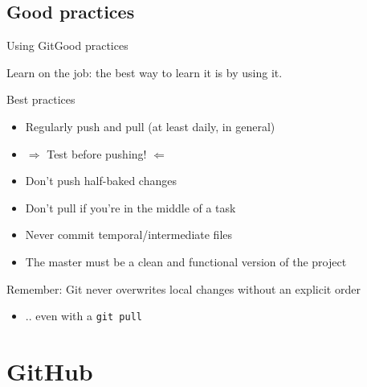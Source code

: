 \documentclass[10pt,compress]{beamer} %
\begin{document}



\subsection{Good practices}
\begin{frame}{Using Git}{Good practices}


Learn on the job: the best way to learn it is by using it. 

\bigskip

Best practices
\begin{itemize}
  \item Regularly push and pull (at least daily, in general)
  \item $\Rightarrow$ Test before pushing! $\Leftarrow$
  \item Don't push half-baked changes 
  \item Don't pull if you're in the middle of a task
  \item Never commit temporal/intermediate files
  \item The master must be a clean and functional version of the project
\end{itemize}

Remember: Git never overwrites local changes without an explicit order
\begin{itemize}
  \item .. even with a \texttt{git pull}
\end{itemize}

\end{frame}


\section{GitHub}
\end{document}
